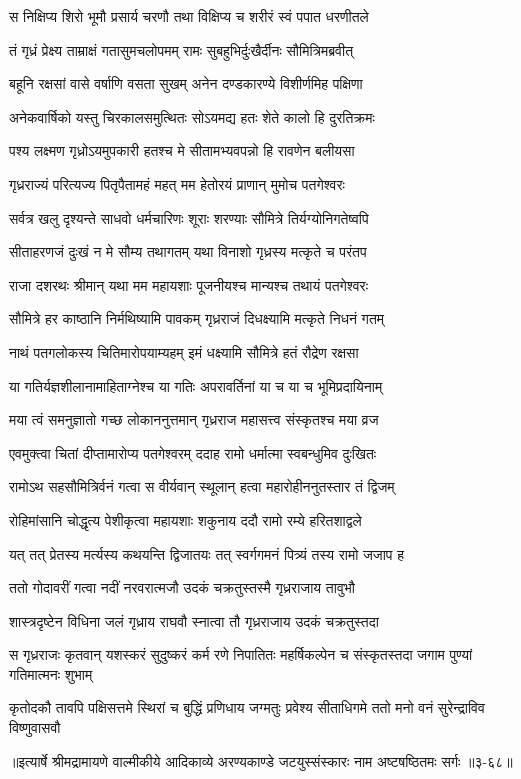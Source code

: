 \twolineshloka
{स निक्षिप्य शिरो भूमौ प्रसार्य चरणौ तथा}
{विक्षिप्य च शरीरं स्वं पपात धरणीतले} %

\twolineshloka
{तं गृध्रं प्रेक्ष्य ताम्राक्षं गतासुमचलोपमम्}
{रामः सुबहुभिर्दुःखैर्दीनः सौमित्रिमब्रवीत्} %

\twolineshloka
{बहूनि रक्षसां वासे वर्षाणि वसता सुखम्}
{अनेन दण्डकारण्ये विशीर्णमिह पक्षिणा} %

\twolineshloka
{अनेकवार्षिको यस्तु चिरकालसमुत्थितः}
{सोऽयमद्य हतः शेते कालो हि दुरतिक्रमः} %

\twolineshloka
{पश्य लक्ष्मण गृध्रोऽयमुपकारी हतश्च मे}
{सीतामभ्यवपन्नो हि रावणेन बलीयसा} %

\twolineshloka
{गृध्रराज्यं परित्यज्य पितृपैतामहं महत्}
{मम हेतोरयं प्राणान् मुमोच पतगेश्वरः} %

\twolineshloka
{सर्वत्र खलु दृश्यन्ते साधवो धर्मचारिणः}
{शूराः शरण्याः सौमित्रे तिर्यग्योनिगतेष्वपि} %

\twolineshloka
{सीताहरणजं दुःखं न मे सौम्य तथागतम्}
{यथा विनाशो गृध्रस्य मत्कृते च परंतप} %

\twolineshloka
{राजा दशरथः श्रीमान् यथा मम महायशाः}
{पूजनीयश्च मान्यश्च तथायं पतगेश्वरः} %

\twolineshloka
{सौमित्रे हर काष्ठानि निर्मथिष्यामि पावकम्}
{गृध्रराजं दिधक्ष्यामि मत्कृते निधनं गतम्} %

\twolineshloka
{नाथं पतगलोकस्य चितिमारोपयाम्यहम्}
{इमं धक्ष्यामि सौमित्रे हतं रौद्रेण रक्षसा} %

\twolineshloka
{या गतिर्यज्ञशीलानामाहिताग्नेश्च या गतिः}
{अपरावर्तिनां या च या च भूमिप्रदायिनाम्} %

\twolineshloka
{मया त्वं समनुज्ञातो गच्छ लोकाननुत्तमान्}
{गृध्रराज महासत्त्व संस्कृतश्च मया व्रज} %

\twolineshloka
{एवमुक्त्वा चितां दीप्तामारोप्य पतगेश्वरम्}
{ददाह रामो धर्मात्मा स्वबन्धुमिव दुःखितः} %

\twolineshloka
{रामोऽथ सहसौमित्रिर्वनं गत्वा स वीर्यवान्}
{स्थूलान् हत्वा महारोहीननुतस्तार तं द्विजम्} %

\twolineshloka
{रोहिमांसानि चोद्धृत्य पेशीकृत्वा महायशाः}
{शकुनाय ददौ रामो रम्ये हरितशाद्वले} %

\twolineshloka
{यत् तत् प्रेतस्य मर्त्यस्य कथयन्ति द्विजातयः}
{तत् स्वर्गगमनं पित्र्यं तस्य रामो जजाप ह} %

\twolineshloka
{ततो गोदावरीं गत्वा नदीं नरवरात्मजौ}
{उदकं चक्रतुस्तस्मै गृध्रराजाय तावुभौ} %

\twolineshloka
{शास्त्रदृष्टेन विधिना जलं गृध्राय राघवौ}
{स्नात्वा तौ गृध्रराजाय उदकं चक्रतुस्तदा} %

\twolineshloka
{स गृध्रराजः कृतवान् यशस्करं सुदुष्करं कर्म रणे निपातितः}
{महर्षिकल्पेन च संस्कृतस्तदा जगाम पुण्यां गतिमात्मनः शुभाम्} %

\twolineshloka
{कृतोदकौ तावपि पक्षिसत्तमे स्थिरां च बुद्धिं प्रणिधाय जग्मतुः}
{प्रवेश्य सीताधिगमे ततो मनो वनं सुरेन्द्राविव विष्णुवासवौ} %


॥इत्यार्षे श्रीमद्रामायणे वाल्मीकीये आदिकाव्ये अरण्यकाण्डे जटयुस्संस्कारः नाम अष्टषष्ठितमः सर्गः ॥३-६८॥
